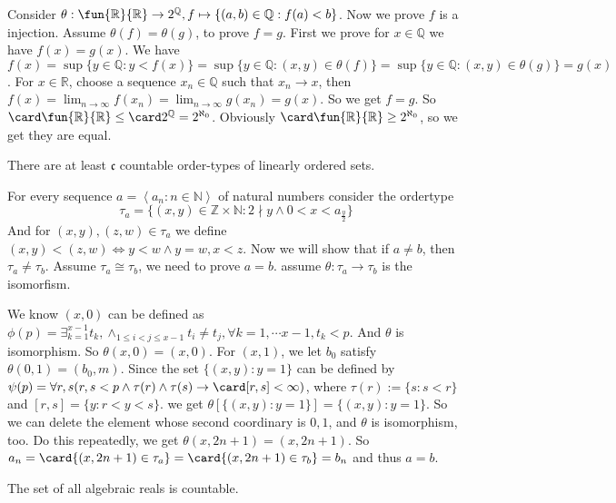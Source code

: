 \documentclass{ctexart}
\begin{document}
\begin{solution}
  Consider \(\theta:\fun{\mathbb{R}}{\mathbb{R}} \to 2^{\mathbb{Q}}, f \mapsto \{(a,b) \in \mathbb{Q}: f(a) < b\}\). 
  Now we prove \(f\) is a injection. 
  Assume \(\theta(f)=\theta(g)\), to prove \(f=g\). 
  First we prove for \(x\in \mathbb{Q}\) we have \(f(x)=g(x)\). 
  We have \(f(x)=\sup \{y \in \mathbb{Q}:y<f(x)\}=\sup\{y \in \mathbb{Q}:(x,y) \in \theta(f)\}=\sup\{y \in \mathbb{Q} : (x,y) \in \theta (g)\}=g(x)\).
  For \(x \in \mathbb{R}\), choose a sequence \(x_n \in \mathbb{Q}\) such that \(x_n \to x\), 
  then \(f(x)= \lim_{n \to \infty }f(x_n)=\lim_{n \to \infty }g(x_n)=g(x)\). 
  So we get \(f=g\). So \(\card \fun{\mathbb{R}}{\mathbb{R}} \leq \card 2^{\mathbb{Q}}=2^{\aleph_0}\).
  Obviously \(\card\fun{\mathbb{R}}{\mathbb{R}} \geq 2^{\aleph_0}\), so we get they are equal. 
\end{solution}
\begin{problem}
There are at least $\mathfrak{c}$ countable order-types of linearly ordered sets.
\end{problem}

\begin{solution}
For every sequence $a=\left\langle a_n: n \in \mathbb{N}\right\rangle$ of natural numbers consider the ordertype
$$
\tau_a=\{(x,y) \in \mathbb{Z}\times \mathbb{N}:2 \nmid y \wedge 0<x<a_{\frac{y}{2}}\}
$$
And for \((x,y),(z,w) \in \tau_a\) we define \((x,y)<(z,w) \iff y<w \wedge y=w,x<z\).
Now we will show that if $a \neq b$, then $\tau_a \neq \tau_b$. 
Assume \(\tau_a \cong \tau_b\), we need to prove \(a=b\). assume \(\theta:\tau_a \to \tau_b\) is the isomorfism. 

We know \((x,0)\) can be defined as \(\phi(p)=\exists_{k=1}^{x-1} t_k,\wedge_{1 \leq i < j \leq x-1}t_i \neq t_j, \forall k=1,\cdots x-1, t_k<p\). 
And \(\theta\) is isomorphism. So \(\theta(x,0)=(x,0)\). 
For \((x,1)\), we let \(b_0\) satisfy \(\theta(0,1)=(b_0,m)\). 
Since the set \(\{(x,y):y=1\}\) can be defined by \(\psi(p)=\forall r,s(r,s<p \wedge \tau(r)\wedge \tau(s) \to \card[r,s] < \infty )\), 
where \(\tau(r):= \{s:s<r\}\) and \([r,s]=\{y:r<y<s\}\). 
we get \(\theta[\{(x,y):y=1\}]=\{(x,y):y=1\}\). 
So we can delete the element whose second coordinary is \(0,1\), and \(\theta\) is isomorphism, too. 
Do this repeatedly, we get \(\theta(x,2n+1)=(x,2n+1)\). 
So \(a_n=\card\{(x,2n+1)\in \tau_a\}=\card \{(x,2n+1) \in \tau_b\}=b_n\) and thus \(a=b\).
\end{solution}
\begin{problem}\label{pro:2}
The set of all algebraic reals is countable.
\end{problem}
\end{document}
